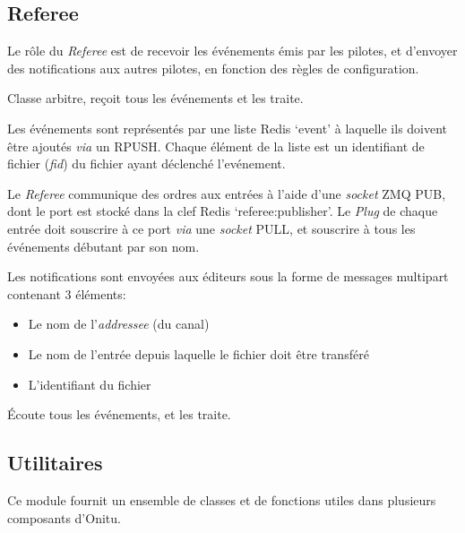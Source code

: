 \documentclass[letterpaper,10pt,english]{sphinxmanual}
\begin{document}
\subsection{Referee}
\label{components:referee}
Le rôle du \emph{Referee} est de recevoir les événements émis par les pilotes, et d'envoyer des notifications aux autres pilotes, en fonction des règles de configuration.

\begin{fulllineitems}
\label{components:onitu.referee.Referee}
Classe arbitre, reçoit tous les événements et les traite.

Les événements sont représentés par une liste Redis `event' à laquelle ils doivent être ajoutés \emph{via} un RPUSH. Chaque élément de la liste est un identifiant de fichier (\emph{fid}) du fichier ayant déclenché l'evénement.

Le \emph{Referee} communique des ordres aux entrées à l'aide d'une \emph{socket} ZMQ PUB, dont le port est stocké dans la clef Redis `referee:publisher'. Le \emph{Plug} de chaque entrée doit souscrire à ce port \emph{via} une \emph{socket} PULL, et souscrire à tous les événements débutant par son nom.

Les notifications sont envoyées aux éditeurs sous la forme de messages multipart contenant 3 éléments:
\begin{itemize}
\item {} 
Le nom de l'\emph{addressee} (du canal)

\item {} 
Le nom de l'entrée depuis laquelle le fichier doit être transféré

\item {} 
L'identifiant du fichier

\end{itemize}

\begin{fulllineitems}
\label{components:onitu.referee.Referee.listen}
Écoute tous les événements, et les traite.

\end{fulllineitems}


\end{fulllineitems}



\subsection{Utilitaires}
\label{components:utils}\label{components:module-onitu.utils}
Ce module fournit un ensemble de classes et de fonctions utiles dans plusieurs composants d'Onitu.
\end{document}
